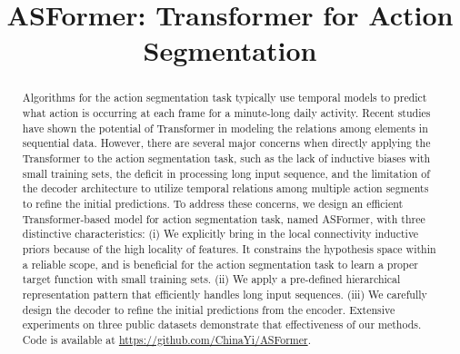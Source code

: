 \documentclass{bmvc2k}
\title{ASFormer: Transformer for Action Segmentation}
\begin{document}
\maketitle
\vspace{-0.5cm}
\begin{abstract}
Algorithms for the action segmentation task typically use temporal models to predict what action is occurring at each frame for a minute-long daily activity. Recent studies have shown the potential of Transformer in modeling the relations among elements in sequential data. However, there are several major concerns when directly applying the Transformer to the action segmentation task, such as the lack of inductive biases with small training sets, the deficit in processing long input sequence, and the limitation of the decoder architecture to utilize temporal relations among multiple action segments to refine the initial predictions. To address these concerns, we design an efficient Transformer-based model for action segmentation task, named ASFormer, with three distinctive characteristics: (i) We explicitly bring in the local connectivity inductive priors because of the high locality of features. It constrains the hypothesis space within a reliable scope, and is beneficial for the action segmentation task to learn a proper target function with small training sets. (ii) We apply a pre-defined hierarchical representation pattern that efficiently handles long input sequences. (iii) We carefully design the decoder to refine the initial predictions from the encoder.  Extensive experiments on three public datasets demonstrate that effectiveness of our methods. Code is available at \url{https://github.com/ChinaYi/ASFormer}.
\end{abstract}
\end{document}
